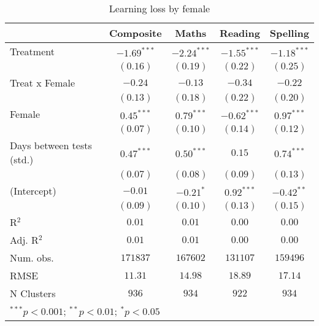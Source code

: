
\begin{table}
\begin{center}
\begin{tabular}{l c c c c}
\hline
 & Composite & Maths & Reading & Spelling \\
\hline
Treatment                 & $-1.69^{***}$ & $-2.24^{***}$ & $-1.55^{***}$ & $-1.18^{***}$ \\
                          & $(0.16)$      & $(0.19)$      & $(0.22)$      & $(0.25)$      \\
Treat x Female            & $-0.24$       & $-0.13$       & $-0.34$       & $-0.22$       \\
                          & $(0.13)$      & $(0.18)$      & $(0.22)$      & $(0.20)$      \\
Female                    & $0.45^{***}$  & $0.79^{***}$  & $-0.62^{***}$ & $0.97^{***}$  \\
                          & $(0.07)$      & $(0.10)$      & $(0.14)$      & $(0.12)$      \\
Days between tests (std.) & $0.47^{***}$  & $0.50^{***}$  & $0.15$        & $0.74^{***}$  \\
                          & $(0.07)$      & $(0.08)$      & $(0.09)$      & $(0.13)$      \\
(Intercept)               & $-0.01$       & $-0.21^{*}$   & $0.92^{***}$  & $-0.42^{**}$  \\
                          & $(0.09)$      & $(0.10)$      & $(0.13)$      & $(0.15)$      \\
\hline
R$^2$                     & $0.01$        & $0.01$        & $0.00$        & $0.00$        \\
Adj. R$^2$                & $0.01$        & $0.01$        & $0.00$        & $0.00$        \\
Num. obs.                 & $171837$      & $167602$      & $131107$      & $159496$      \\
RMSE                      & $11.31$       & $14.98$       & $18.89$       & $17.14$       \\
N Clusters                & $936$         & $934$         & $922$         & $934$         \\
\hline
\multicolumn{5}{l}{\scriptsize{$^{***}p<0.001$; $^{**}p<0.01$; $^{*}p<0.05$}}
\end{tabular}
\caption{Learning loss by female}
\label{tablefemale}
\end{center}
\end{table}
